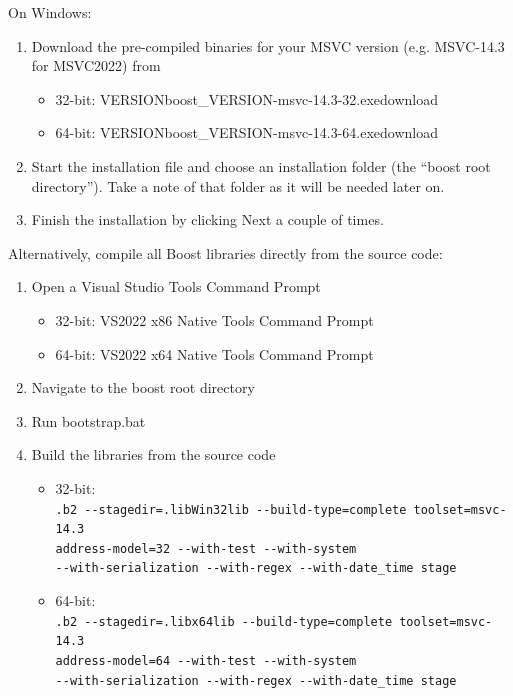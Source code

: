 \medskip
On Windows:
\begin{enumerate}
\item Download the pre-compiled binaries for your MSVC version (e.g. MSVC-14.3 for MSVC2022) from \cite{boost-binaries}
\begin{itemize}
\item 32-bit: \cite{boost-binaries}{\bs}VERSION{\bs}boost\_VERSION-msvc-14.3-32.exe{\bs}download
\item 64-bit: \cite{boost-binaries}{\bs}VERSION{\bs}boost\_VERSION-msvc-14.3-64.exe{\bs}download
\end{itemize}
\item Start the installation file and choose an installation folder (the ``boost root directory'').
  Take a note of that folder as it will be needed later on.
\item Finish the installation by clicking Next a couple of times.
\end{enumerate}

Alternatively, compile all Boost libraries directly from the source code:
\begin{enumerate}
\item Open a Visual Studio Tools Command Prompt
\begin{itemize}
\item 32-bit: VS2022 x86 Native Tools Command Prompt
\item 64-bit: VS2022 x64 Native Tools Command Prompt
\end{itemize}
\item Navigate to the boost root directory
\item Run bootstrap.bat
\item Build the libraries from the source code
\begin{itemize}
\item 32-bit: \\
  {\footnotesize\tt .{\bs}b2 -{}-stagedir=.{\bs}lib{\bs}Win32{\bs}lib -{}-build-type=complete toolset=msvc-14.3 \bs \\
    address-model=32 -{}-with-test -{}-with-system  \bs \\
    -{}-with-serialization -{}-with-regex -{}-with-date\_time stage}
\item 64-bit: \\
  {\footnotesize\tt .{\bs}b2 -{}-stagedir=.{\bs}lib{\bs}x64{\bs}lib -{}-build-type=complete toolset=msvc-14.3 \bs \\
    address-model=64 -{}-with-test -{}-with-system \bs \\
    -{}-with-serialization -{}-with-regex -{}-with-date\_time stage}
\end{itemize}
\end{enumerate}

